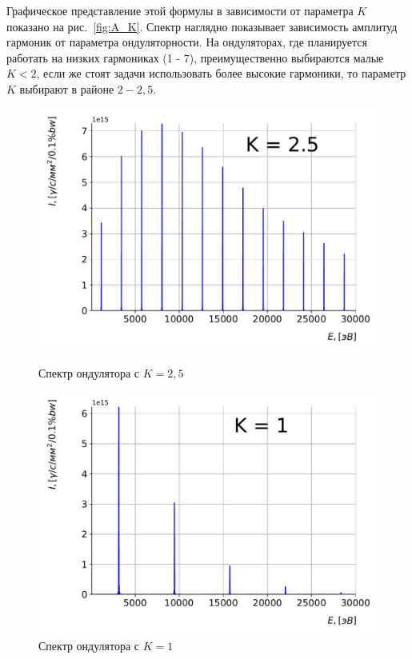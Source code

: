 Графическое представление этой формулы в зависимости от параметра $K$ показано на рис.~\ref{fig:A_K}. Спектр наглядно показывает зависимость амплитуд гармоник от параметра ондуляторности. На ондуляторах, где планируется работать на низких гармониках (1 - 7), преимущественно выбираются малые $K < 2$, если же стоят задачи использовать более высокие гармоники, то параметр $K$ выбирают в районе $2 - 2,5$.
\begin{figure}[h!]
	\begin{minipage}{0.49\textwidth}
		\centering
		\includegraphics[width=\textwidth]{pic/spec_und_1-1.pdf}
		\caption{Спектр ондулятора с $K = 2,5$}
		\label{fig:spec_und_1-1}
	\end{minipage}
	\begin{minipage}{0.49\textwidth}
		\centering
		\includegraphics[width=\textwidth]{pic/spec_und_1-2.pdf}
		\caption{Спектр ондулятора с $K = 1$}
		\label{fig:spec_und_1-2}
	\end{minipage}    
\end{figure}

